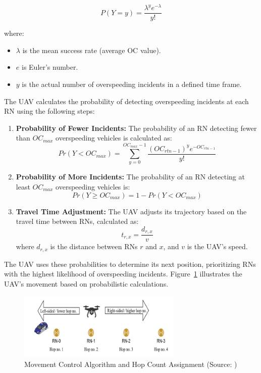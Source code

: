 \begin{equation}
P(Y = y) = \frac{\lambda^y e^{-\lambda}}{y!}
\label{eq:poisson}
\end{equation}

where:
\begin{itemize}
    \item \( \lambda \) is the mean success rate (average OC value).
    \item \( e \) is Euler’s number.
    \item \( y \) is the actual number of overspeeding incidents in a defined time frame.
\end{itemize}

The UAV calculates the probability of detecting overspeeding incidents at each RN using the following steps:
\begin{enumerate}
    \item \textbf{Probability of Fewer Incidents:} The probability of an RN detecting fewer than \( OC_{max} \) overspeeding vehicles is calculated as:
    \begin{equation}
    Pr(Y < OC_{max}) = \sum_{y=0}^{OC_{max}-1} \frac{(OC_{rtn-1})^y e^{-OC_{rtn-1}}}{y!}
    \label{eq:prob_less}
    \end{equation}

    \item \textbf{Probability of More Incidents:} The probability of an RN detecting at least \( OC_{max} \) overspeeding vehicles is:
    \begin{equation}
    Pr(Y \geq OC_{max}) = 1 - Pr(Y < OC_{max})
    \label{eq:prob_more}
    \end{equation}

    \item \textbf{Travel Time Adjustment:} The UAV adjusts its trajectory based on the travel time between RNs, calculated as:
    \begin{equation}
    t_{r,x} = \frac{d_{r,x}}{v}
    \label{eq:travel_time}
    \end{equation}
    where \( d_{r,x} \) is the distance between RNs \( r \) and \( x \), and \( v \) is the UAV’s speed.
\end{enumerate}

The UAV uses these probabilities to determine its next position, prioritizing RNs with the highest likelihood of overspeeding incidents. Figure~\ref{fig:hop_numbers} illustrates the UAV’s movement based on probabilistic calculations.

\begin{figure}[h]
    \centering
    \includegraphics[width=0.7\textwidth]{Figures/Chapter3/Method6/2.png}
    \caption{Movement Control Algorithm and Hop Count Assignment (Source: \cite{bashir2022closed})}
    \label{fig:hop_numbers}
\end{figure}

